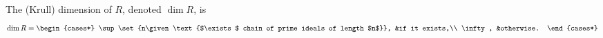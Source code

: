 The (Krull) dimension of $R$, denoted $\dim R$, is
\[\dim R =
\begin{cases*}
	\sup \set{n\given\text{$\exists$ chain of prime ideals of length $n$}}, &if it exists,\\
	\infty, &otherwise.
\end{cases*}
	\]
